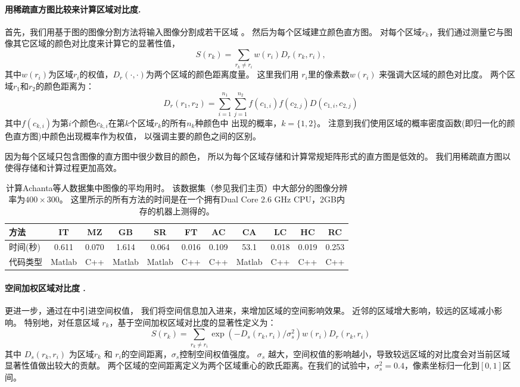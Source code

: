 \documentclass[final]{cvpr}
\newcommand{\IT}{IT\cite{98pami/Itti}}
\newcommand{\MZ}{MZ\cite{03ACMMM/Ma_Contrast-based}}
\newcommand{\GB}{GB\cite{conf/nips/HarelKP06}}
\newcommand{\SR}{SR\cite{07cvpr/hou_SpectralResidual}}
\newcommand{\FT}{FT\cite{09cvpr/Achanta_FTSaliency}}
\newcommand{\CA}{CA\cite{10cvpr/goferman_context}}
\newcommand{\LC}{LC\cite{06acmmm/ZhaiS_spatiotemporal}}
\newcommand{\AC}{AC\cite{08cvs/achanta_salient}}
\newcommand{\mypara}[1]{\paragraph{#1.}}
\begin{document}
\mypara{用稀疏直方图比较来计算区域对比度}
首先，我们用基于图的图像分割方法将输入图像分割成若干区域
\cite{04ijcv/felzenszwalb_efficient}。
然后为每个区域建立颜色直方图。
对每个区域$r_k$，我们通过测量它与图像其它区域的颜色对比度来计算它的显著性值，
\begin{equation}\label{equ:regContrastSaliency}
    S(r_k) = \sum_{r_k \neq r_i} w(r_i)  D_r(r_k, r_i),
\end{equation}
其中$w(r_i)$为区域$r_i$的权值，$D_r(\cdot, \cdot)$为两个区域的颜色距离度量。
这里我们用 $r_i$里的像素数$w(r_i)$ 来强调大区域的颜色对比度。
两个区域$r_1$和$r_2$的颜色距离为：
\begin{equation}\label{equ:regContrast}
    D_r(r_1, r_2) = \sum_{i=1}^{n_1} \sum_{j=1}^{n_2} f(c_{1,i}) f(c_{2,j}) D(c_{1,i}, c_{2,j})
\end{equation}
其中$f(c_{k,i})$为第$i$个颜色$c_{k,i}$在第$k$个区域$r_k$的所有$n_k$种颜色中
出现的概率，$k=\{1,2\}$。
注意到我们使用区域的概率密度函数(即归一化的颜色直方图)中颜色出现概率作为权值，
以强调主要的颜色之间的区别。

因为每个区域只包含图像的直方图中很少数目的颜色，
所以为每个区域存储和计算常规矩阵形式的直方图是低效的。
我们用稀疏直方图以使得存储和计算过程更加高效。



\begin{table}
    \centering
    \begin{tabular}{l|c|c|c|c|c|c|c|c|c|c} \hline\hline
      方法  &  \IT   &  \MZ  &   \GB  &  \SR   &  \FT  &  \AC  &  \CA   & \LC   &  HC   &  RC   \\ \hline
      时间(秒) & 0.611  & 0.070 & 1.614  & 0.064  & 0.016 & 0.109 &  53.1  & 0.018 & 0.019 & 0.253 \\ \hline
      代码类型    & Matlab & C++   & Matlab & Matlab &  C++  &  C++  & Matlab &  C++  &  C++  &  C++  \\ \hline\hline
    \end{tabular}
    \caption{计算Achanta等人数据集\cite{09cvpr/Achanta_FTSaliency}中图像的平均用时。
        该数据集（参见我们主页）中大部分的图像分辨率为$400\times300$。
        这里所示的所有方法的时间是在一个拥有Dual Core 2.6 GHz
        CPU，2GB内存的机器上测得的。
    } \label{tab:TimeEfficency}
\end{table}


\mypara{空间加权区域对比度 }
更进一步，通过在中引进空间权值，
我们将空间信息加入进来，来增加区域的空间影响效果。
近邻的区域增大影响，较远的区域减小影响。
特别地，对任意区域 $r_k$，基于空间加权区域对比度的显著性定义为：
\begin{equation}\label{equ:regContrastSpatial}
    S(r_k)=\sum_{r_k\neq r_i}\exp({-D_s(r_k,r_i)/\sigma_s^2})w(r_i) D_r(r_k, r_i)
\end{equation}
其中 $D_s(r_k, r_i)$ 为区域$r_k$ 和 $r_i$的空间距离，$\sigma_s$控制空间权值强度。
$\sigma_s$ 越大，空间权值的影响越小，导致较远区域的对比度会对当前区域显著性值做出较大的贡献。
两个区域的空间距离定义为两个区域重心的欧氏距离。在我们的试验中，$\sigma_s^2 = 0.4$，像素坐标归一化到$[0, 1]$区间。
\end{document}
